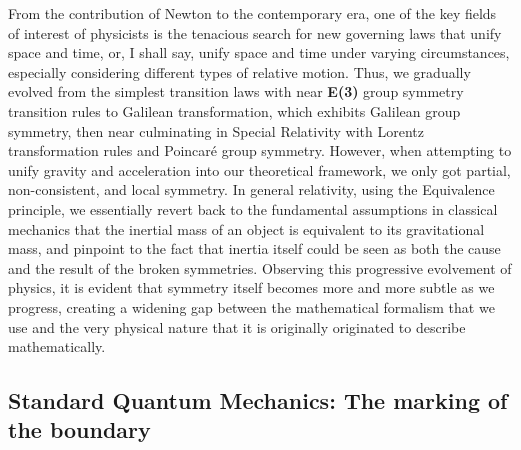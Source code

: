 \documentclass{article}
\begin{document}
From the contribution of Newton to the contemporary era, one of the key fields of interest of physicists is the tenacious search for new governing laws that unify space and time, or, I shall say, unify space and time under varying circumstances, especially considering different types of relative motion. Thus, we gradually evolved from the simplest transition laws with near \textbf{E(3)} group symmetry transition rules to Galilean transformation, which exhibits Galilean group symmetry, then near culminating in Special Relativity with Lorentz transformation rules and Poincaré group symmetry. \cite{Jackson2024} \cite{Romero2026} However, when attempting to unify gravity and acceleration into our theoretical framework, we only got partial, non-consistent, and local symmetry. \cite{Pineda2025} In general relativity, using the Equivalence principle, we essentially revert back to the fundamental assumptions in classical mechanics that the inertial mass of an object is equivalent to its gravitational mass,\cite{Newton2021} and pinpoint to the fact that inertia itself could be seen as both the cause and the result of the broken symmetries. \cite{LandauLifshitzV2_2012} \cite{LandauLifshitzV1_2007}  Observing this progressive evolvement of physics, it is evident that symmetry itself becomes more and more subtle as we progress, creating a widening gap between the mathematical formalism that we use and the very physical nature that it is originally originated to describe mathematically.

\subsection{Standard Quantum Mechanics: The marking of the boundary}
\end{document}
